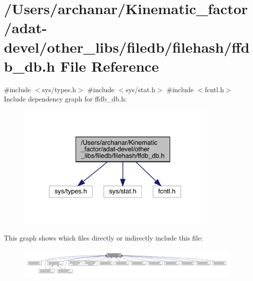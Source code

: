\hypertarget{adat-devel_2other__libs_2filedb_2filehash_2ffdb__db_8h}{}\section{/\+Users/archanar/\+Kinematic\+\_\+factor/adat-\/devel/other\+\_\+libs/filedb/filehash/ffdb\+\_\+db.h File Reference}
\label{adat-devel_2other__libs_2filedb_2filehash_2ffdb__db_8h}
{\ttfamily \#include $<$sys/types.\+h$>$}\newline
{\ttfamily \#include $<$sys/stat.\+h$>$}\newline
{\ttfamily \#include $<$fcntl.\+h$>$}\newline
Include dependency graph for ffdb\+\_\+db.\+h\+:
\nopagebreak
\begin{figure}[H]
\begin{center}
\leavevmode
\includegraphics[width=282pt]{d7/dda/adat-devel_2other__libs_2filedb_2filehash_2ffdb__db_8h__incl}
\end{center}
\end{figure}
This graph shows which files directly or indirectly include this file\+:
\nopagebreak
\begin{figure}[H]
\begin{center}
\leavevmode
\includegraphics[width=350pt]{d7/d28/adat-devel_2other__libs_2filedb_2filehash_2ffdb__db_8h__dep__incl}
\end{center}
\end{figure}
